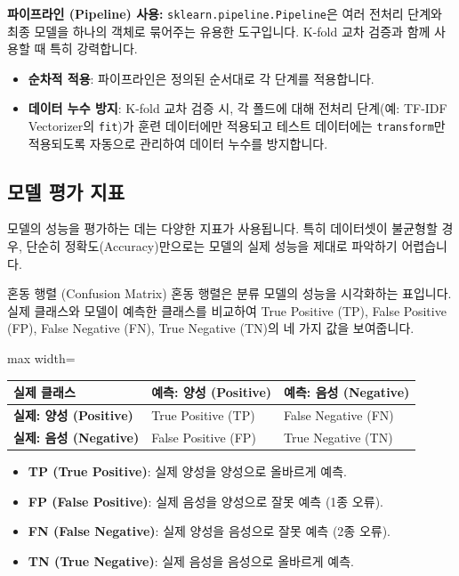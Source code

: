\documentclass[11pt,a4paper]{article}
\begin{document}
\textbf{파이프라인 (Pipeline) 사용:}
\texttt{sklearn.pipeline.Pipeline}은 여러 전처리 단계와 최종 모델을 하나의 객체로 묶어주는 유용한 도구입니다. K-fold 교차 검증과 함께 사용할 때 특히 강력합니다.
\begin{itemize}
    \item \textbf{순차적 적용}: 파이프라인은 정의된 순서대로 각 단계를 적용합니다.
    \item \textbf{데이터 누수 방지}: K-fold 교차 검증 시, 각 폴드에 대해 전처리 단계(예: TF-IDF Vectorizer의 \texttt{fit})가 훈련 데이터에만 적용되고 테스트 데이터에는 \texttt{transform}만 적용되도록 자동으로 관리하여 데이터 누수를 방지합니다.
\end{itemize}

\subsection{모델 평가 지표}

모델의 성능을 평가하는 데는 다양한 지표가 사용됩니다. 특히 데이터셋이 불균형할 경우, 단순히 정확도(Accuracy)만으로는 모델의 실제 성능을 제대로 파악하기 어렵습니다.

\begin{infobox}{혼동 행렬 (Confusion Matrix)}
혼동 행렬은 분류 모델의 성능을 시각화하는 표입니다. 실제 클래스와 모델이 예측한 클래스를 비교하여 True Positive (TP), False Positive (FP), False Negative (FN), True Negative (TN)의 네 가지 값을 보여줍니다.

\begin{adjustbox}{max width=\textwidth}
\begin{tabular}{l|ll}
\toprule
\textbf{실제 클래스} & \textbf{예측: 양성 (Positive)} & \textbf{예측: 음성 (Negative)} \\
\midrule
\textbf{실제: 양성 (Positive)} & True Positive (TP) & False Negative (FN) \\
\textbf{실제: 음성 (Negative)} & False Positive (FP) & True Negative (TN) \\
\bottomrule
\end{tabular}
\end{adjustbox}
\begin{itemize}
    \item \textbf{TP (True Positive)}: 실제 양성을 양성으로 올바르게 예측.
    \item \textbf{FP (False Positive)}: 실제 음성을 양성으로 잘못 예측 (1종 오류).
    \item \textbf{FN (False Negative)}: 실제 양성을 음성으로 잘못 예측 (2종 오류).
    \item \textbf{TN (True Negative)}: 실제 음성을 음성으로 올바르게 예측.
\end{itemize}
\end{infobox}
\end{document}
